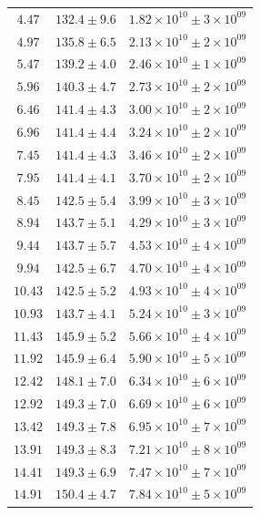 \documentclass{article}
\begin{document}
\begin{table}[h!]
\begin{tabular}{|c|c|c|}
        $4.47$ & $132.4 \pm 9.6$ & $1.82\times 10^{10} \pm 3\times 10^{09}$ \\
        $4.97$ & $135.8 \pm 6.5$ & $2.13\times 10^{10} \pm 2\times 10^{09}$ \\
        $5.47$ & $139.2 \pm 4.0$ & $2.46\times 10^{10} \pm 1\times 10^{09}$ \\
        $5.96$ & $140.3 \pm 4.7$ & $2.73\times 10^{10} \pm 2\times 10^{09}$ \\
        $6.46$ & $141.4 \pm 4.3$ & $3.00\times 10^{10} \pm 2\times 10^{09}$ \\
        $6.96$ & $141.4 \pm 4.4$ & $3.24\times 10^{10} \pm 2\times 10^{09}$ \\
        $7.45$ & $141.4 \pm 4.3$ & $3.46\times 10^{10} \pm 2\times 10^{09}$ \\
        $7.95$ & $141.4 \pm 4.1$ & $3.70\times 10^{10} \pm 2\times 10^{09}$ \\
        $8.45$ & $142.5 \pm 5.4$ & $3.99\times 10^{10} \pm 3\times 10^{09}$ \\
        $8.94$ & $143.7 \pm 5.1$ & $4.29\times 10^{10} \pm 3\times 10^{09}$ \\
        $9.44$ & $143.7 \pm 5.7$ & $4.53\times 10^{10} \pm 4\times 10^{09}$ \\
        $9.94$ & $142.5 \pm 6.7$ & $4.70\times 10^{10} \pm 4\times 10^{09}$ \\
        $10.43$ & $142.5 \pm 5.2$ & $4.93\times 10^{10} \pm 4\times 10^{09}$ \\
        $10.93$ & $143.7 \pm 4.1$ & $5.24\times 10^{10} \pm 3\times 10^{09}$ \\
        $11.43$ & $145.9 \pm 5.2$ & $5.66\times 10^{10} \pm 4\times 10^{09}$ \\
        $11.92$ & $145.9 \pm 6.4$ & $5.90\times 10^{10} \pm 5\times 10^{09}$ \\
        $12.42$ & $148.1 \pm 7.0$ & $6.34\times 10^{10} \pm 6\times 10^{09}$ \\
        $12.92$ & $149.3 \pm 7.0$ & $6.69\times 10^{10} \pm 6\times 10^{09}$ \\
        $13.42$ & $149.3 \pm 7.8$ & $6.95\times 10^{10} \pm 7\times 10^{09}$ \\
        $13.91$ & $149.3 \pm 8.3$ & $7.21\times 10^{10} \pm 8\times 10^{09}$ \\
        $14.41$ & $149.3 \pm 6.9$ & $7.47\times 10^{10} \pm 7\times 10^{09}$ \\
        $14.91$ & $150.4 \pm 4.7$ & $7.84\times 10^{10} \pm 5\times 10^{09}$ \\

\end{tabular}
\end{table}
\end{document}
